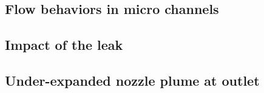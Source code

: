 \subsection{Flow behaviors in micro channels}\label{sec:micro-channels}
	
	\newpage

\subsection{Impact of the leak}\label{sec:disconnected-reservoirs}
	
	\newpage

\subsection{Under-expanded nozzle plume at outlet}\label{sec:outlet_plume}
	
	\newpage
